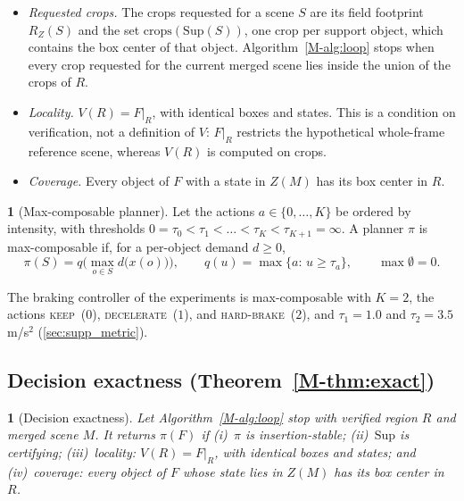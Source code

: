 \documentclass[10pt,letterpaper]{article}
\newcommand{\draft}{C}
\newcommand{\full}{F}
\newcommand{\merged}{M}
\newcommand{\Sup}{\mathrm{Sup}}
\newcommand{\field}{Z}
\newcommand{\foot}{R_{\field}}
\newcommand{\policy}{\pi}
\newcommand{\dem}{d}
\theoremstyle{remark}
\theoremstyle{plain}
\newtheorem*{restatedinner}{\restatedname}
\newcommand{\restatedname}{}
\newenvironment{restated}[3]{\renewcommand{\restatedname}{#1~#2}\begin{restatedinner}[#3]}{\end{restatedinner}}
\theoremstyle{definition}
\newtheorem*{restateddefinner}{\restatedname}
\newenvironment{restateddef}[3]{\renewcommand{\restatedname}{#1~#2}\begin{restateddefinner}[#3]}{\end{restateddefinner}}
\newcommand{\mrefnum}[1]{\ref*{M-#1}}
\begin{document}
\begin{itemize}
\begin{equation}
\merged(R)=(\draft\setminus\draft|_R)\cup V(R).
\label{eq:s_merged}
\end{equation}
\item \emph{Requested crops.} The crops requested for a scene $S$ are its field footprint $\foot(S)$ and the set $\mathrm{crops}(\Sup(S))$, one crop per support object, which contains the box center of that object. Algorithm~\mrefnum{alg:loop} stops when every crop requested for the current merged scene lies inside the union of the crops of $R$.
\item \emph{Locality.} $V(R)=\full|_R$, with identical boxes and states. This is a condition on verification, not a definition of $V$: $\full|_R$ restricts the hypothetical whole-frame reference scene, whereas $V(R)$ is computed on crops.
\item \emph{Coverage.} Every object of $\full$ with a state in $\field(\merged)$ has its box center in $R$.
\end{itemize}

\begin{restateddef}{Definition}{\mrefnum{def:maxcomp}}{Max-composable planner}
Let the actions $a\in\{0,\dots,K\}$ be ordered by intensity, with thresholds $0=\tau_0<\tau_1<\dots<\tau_K<\tau_{K+1}=\infty$.
A planner $\policy$ is max-composable if, for a per-object demand $\dem\ge0$,
\begin{equation}
\policy(S)=q\Big(\max_{o\in S}\dem\big(x(o)\big)\Big),\qquad q(u)=\max\{a:\,u\ge\tau_a\},\qquad \max\emptyset=0.
\label{eq:s_maxcomp}
\end{equation}
\end{restateddef}

The braking controller of the experiments is max-composable with $K=2$, the actions \textsc{keep}~($0$), \textsc{decelerate}~($1$), and \textsc{hard-brake}~($2$), and $\tau_1=1.0$ and $\tau_2=3.5$\,m/s$^2$ (\cref{sec:supp_metric}).

\subsection{Decision exactness (Theorem~\protect\mrefnum{thm:exact})}
\label{sec:proof_thm}

\begin{restated}{Theorem}{\mrefnum{thm:exact}}{Decision exactness}
Let Algorithm~\mrefnum{alg:loop} stop with verified region $R$ and merged scene $\merged$.
It returns $\policy(\full)$ if (i)~$\policy$ is insertion-stable; (ii)~$\Sup$ is certifying; (iii)~\emph{locality}: $V(R)=\full|_R$, with identical boxes and states; and (iv)~\emph{coverage}: every object of $\full$ whose state lies in $\field(\merged)$ has its box center in $R$.
\end{restated}
\end{document}
